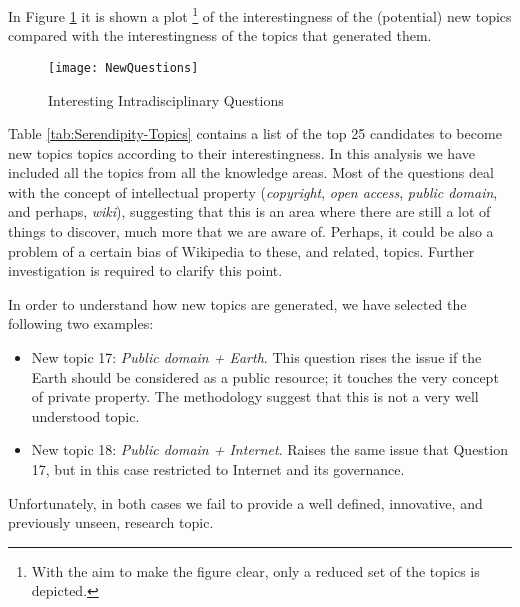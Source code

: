 In Figure \ref{fig:Interesting-Intradisciplinary-Qu} it is shown
a plot%
\footnote{With the aim to make the figure clear, only a reduced set of the topics
is depicted.%
} of the interestingness of the (potential) new topics compared with
the interestingness of the topics that generated them.

\begin{figure}[h]
\centering\texttt{[image: NewQuestions]}
\caption{\label{fig:Interesting-Intradisciplinary-Qu}Interesting Intradisciplinary
Questions}
\end{figure}

Table \ref{tab:Serendipity-Topics} contains a list of the top 25
candidates to become new topics topics according to their interestingness.
In this analysis we have included all the topics from all the knowledge
areas. Most of the questions deal with the concept of intellectual
property (\emph{copyright}, \emph{open access}, \emph{public domain},
and perhaps, \emph{wiki}), suggesting that this is an area where there
are still a lot of things to discover, much more that we are aware
of. Perhaps, it could be also a problem of a certain bias of Wikipedia
to these, and related, topics. Further investigation is required to
clarify this point.

In order to understand how new topics are generated, we have selected
the following two examples:
\begin{itemize}
\item New topic 17: \emph{Public domain + Earth}. This question rises the
issue if the Earth should be considered as a public resource; it touches
the very concept of private property. The methodology suggest that
this is not a very well understood topic.
\item New topic 18: \emph{Public domain + Internet}. Raises the same issue
that Question 17, but in this case restricted to Internet and its
governance.
\end{itemize}
Unfortunately, in both cases we fail to provide a well defined, innovative,
and previously unseen, research topic.

